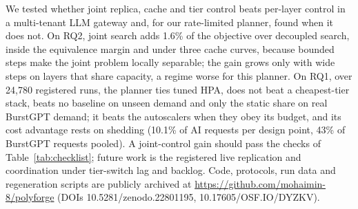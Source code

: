 \documentclass[conference,a4paper]{IEEEtran}
\newif\ifblind
\begin{document}
We tested whether joint replica, cache and tier control beats per-layer
control in a multi-tenant LLM gateway and, for our rate-limited planner,
found when it does not. On RQ2, joint search adds 1.6\% of the objective over
decoupled search, inside the equivalence margin and under three cache
curves, because bounded steps make the joint problem locally separable; the
gain grows only with wide steps on layers that share capacity, a regime worse
for this planner. On RQ1, over 24{,}780 registered runs, the planner ties
tuned HPA, does not beat a cheapest-tier stack, beats no baseline on unseen
demand and only the static share on real BurstGPT demand; it beats the
autoscalers when they obey its budget, and its cost advantage rests on
shedding (10.1\% of AI requests per design point, 43\% of BurstGPT requests
pooled). A joint-control gain should pass the checks of
Table~\ref{tab:checklist}; future work is the registered live replication
and coordination under tier-switch lag and backlog. Code, protocols, run data
and regeneration scripts are publicly archived\ifblind; we withhold the links
for double-blind review.\else{}
at \url{https://github.com/mohaimin-8/polyforge} (DOIs
10.5281/zenodo.22801195, 10.17605/OSF.IO/DYZKV).\fi

\end{document}

